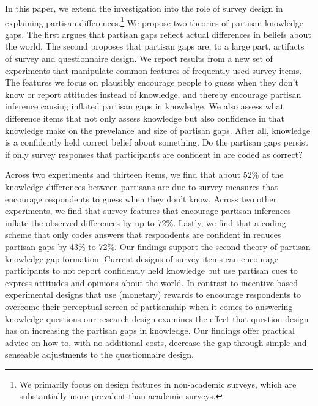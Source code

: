\documentclass[12pt, letterpaper]{article}
\begin{document}
In this paper, we extend the investigation into the role of survey design in explaining partisan differences.\footnote{We primarily focus on design features in non-academic surveys, which are substantially more prevalent than academic surveys.} We propose two theories of partisan knowledge gaps. The first argues that partisan gaps reflect actual differences in beliefs about the world. The second proposes that partisan gaps are, to a large part, artifacts of survey and questionnaire design. We report results from a new set of experiments that manipulate common features of frequently used survey items. The features we focus on plausibly encourage people to guess when they don't know or report attitudes instead of knowledge, and thereby encourage partisan inference causing inflated partisan gaps in knowledge. We also assess what difference items that not only assess knowledge but also confidence in that knowledge make on the prevelance and size of partisan gaps. After all, knowledge is a confidently held correct belief about something. Do the partisan gaps persist if only survey responses that participants are confident in are coded as correct?

Across two experiments and thirteen items, we find that about 52\% of the knowledge differences between partisans are due to survey measures that encourage respondents to guess when they don't know. Across two other experiments, we find that survey features that encourage partisan inferences inflate the observed differences by up to 72\%. Lastly, we find that a coding scheme that only codes answers that respondents are confident in reduces partisan gaps by 43\% to 72\%. Our findings support the second theory of partisan knowledge gap formation. Current designs of survey items can encourage participants to not report confidently held knowledge but use partisan cues to express attitudes and opinions about the world. In contrast to incentive-based experimental designs that use (monetary) rewards to encourage respondents to overcome their perceptual screen of partisanship when it comes to answering knowledge questions \citep[for example, see][]{bullocketal_2015, peterson2021partisan} our research design examines the effect that question design has on increasing the partisan gaps in knowledge. Our findings offer practical advice on how to, with no additional costs, decrease the gap through simple and senseable adjustments to the questionnaire design.
\end{document}
